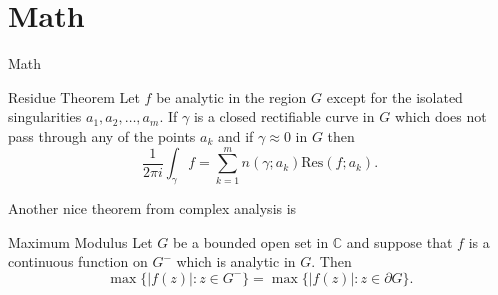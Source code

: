 \documentclass[xcolor={svgnames,table},10pt,fleqn]{beamer}
\begin{document}
\section{Math}

\begin{frame}{Math}
\begin{block}{Residue Theorem}
Let $f$ be analytic in the region $G$ except for the isolated singularities $a_1,a_2,\ldots,a_m$. If $\gamma$ is a closed rectifiable curve in $G$ which does not pass through any of the points $a_k$ and if $\gamma\approx 0$ in $G$ then
\[
\frac{1}{2\pi i}\int_\gamma f = \sum_{k=1}^m n(\gamma;a_k) \text{Res}(f;a_k).
\]
\end{block}

Another nice theorem from complex analysis is

\begin{block}{Maximum Modulus}
Let $G$ be a bounded open set in $\mathbb{C}$ and suppose that $f$ is a continuous function on $G^-$ which is analytic in $G$. Then
\[
\max\{|f(z)|:z\in G^-\}=\max \{|f(z)|:z\in \partial G \}.
\]
\end{block}
\end{frame}




\begin{frame}[plain]
\end{frame}
\end{document}
